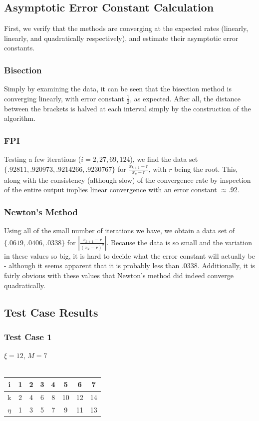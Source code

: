 \documentclass[11pt]{article} %
\begin{document}
\subsection*{Asymptotic Error Constant Calculation}
First, we verify that the methods are converging at the expected rates (linearly, linearly, and quadratically respectively), and estimate their asymptotic error constants.

\subsubsection*{Bisection}
Simply by examining the data, it can be seen that the bisection method is converging linearly, with error constant $\frac{1}{2}$, as expected. After all, the distance between the brackets is halved at each interval simply by the construction of the algorithm.
\subsubsection*{FPI}
Testing a few iterations ($i = 2, 27, 69, 124$), we find the data set $\{.92811,.920973,.9214266,.9230767\}$ for $\frac{x_{k+1}-r}{x_k - r}$, with $r$ being the root. This, along with the consistency (although slow) of the convergence rate by inspection of the entire output implies linear convergence with an error constant $\approx .92$.
\subsubsection*{Newton's Method}
Using all of the small number of iterations we have, we obtain a data set of $\{.0619,.0406,.0338\}$ for $|\frac{x_{k+1}-r}{(x_k - r)^2}|$. Because the data is so small and the variation in these values so big, it is hard to decide what the error constant will actually be - although it seems apparent that it is probably less than $.0338$. Additionally, it is fairly obvious with these values that Newton's method did indeed converge quadratically.
\subsection*{Test Case Results}
\subsubsection*{Test Case 1}
$\xi = 12$, $M = 7$ \\ \\
\begin{tabular}{||c||c c c c c c c|}
\hline
i & 1 & 2 & 3 & 4 & 5 & 6 & 7 \\
\hline
k & 2 & 4 & 6 & 8 & 10 & 12 & 14 \\
\hline
$\eta$ & 1 & 3 & 5 & 7 & 9 & 11 & 13 \\
\hline
\end{tabular}
\end{document}
